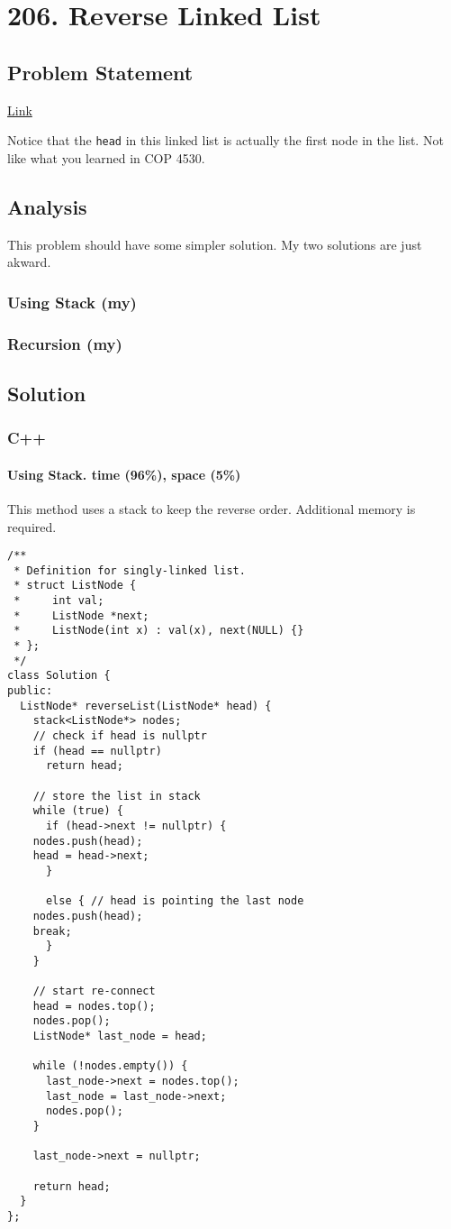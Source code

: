\documentclass[12pt]{article}
\begin{document}
\section{206. Reverse Linked List}
\label{sec:orgc6ca179}
\subsection{Problem Statement}
\label{sec:org1e388d8}
\href{https://leetcode.com/problems/reverse-linked-list/}{Link}

Notice that the \texttt{head} in this linked list is actually the first node in the list. Not like what you learned in COP 4530.
\subsection{Analysis}
\label{sec:orgdd2a762}
This problem should have some simpler solution. My two solutions are just akward.
\subsubsection{Using Stack (my)}
\label{sec:orgb98b901}
\subsubsection{Recursion (my)}
\label{sec:org45a69a3}
\subsection{Solution}
\label{sec:org6d219bf}
\subsubsection{C++}
\label{sec:org03aeffa}
\paragraph{Using Stack. time (96\%), space (5\%)}
\label{sec:orge4117a7}
This method uses a stack to keep the reverse order. Additional memory is required.
\begin{verbatim}
/**
 * Definition for singly-linked list.
 * struct ListNode {
 *     int val;
 *     ListNode *next;
 *     ListNode(int x) : val(x), next(NULL) {}
 * };
 */
class Solution {
public:
  ListNode* reverseList(ListNode* head) {
    stack<ListNode*> nodes;
    // check if head is nullptr
    if (head == nullptr)
      return head;

    // store the list in stack 
    while (true) {
      if (head->next != nullptr) {
	nodes.push(head);
	head = head->next;
      }

      else { // head is pointing the last node
	nodes.push(head);
	break;
      }
    }

    // start re-connect
    head = nodes.top();
    nodes.pop();
    ListNode* last_node = head;

    while (!nodes.empty()) {
      last_node->next = nodes.top();
      last_node = last_node->next;
      nodes.pop();
    }

    last_node->next = nullptr;

    return head;
  }
};
\end{verbatim}
\end{document}
